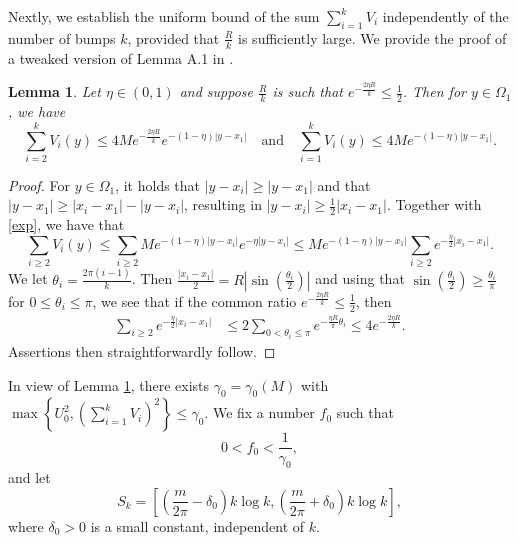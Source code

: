 \documentclass{amsart}
\newtheorem{lemma}[theorem]{Lemma}
\theoremstyle{definition}
\theoremstyle{remark}
\numberwithin{equation}{section}
\begin{document}
 
 



Nextly, we  establish the uniform bound of the sum $\displaystyle \sum_{i=1}^k V_{i}$ independently of the number of bumps $k$, provided that $\frac{R}{k}$ is sufficiently large. We provide the proof of a tweaked version of Lemma A.1 in \cite{wei_yan_2014}.
\begin{lemma}\label{ksum}  \cite[Lemma A.1]{wei_yan_2014} Let $\eta \in (0,1)$ and suppose $\frac{R}{k}$ is such that $e^{-\frac{2\eta R}{k}} \le \frac{1}{2}$. Then for $y \in{\Omega}_1$, we have 
$$\displaystyle \sum_{i=2}^k V_{i}(y) \le 4Me^{-\frac{2\eta R}{k}} e^{-(1-\eta)|y-x_1|} \quad\text{and} \quad \displaystyle \sum_{i=1}^k V_{i}(y) \le 4Me^{-(1-\eta)|y-x_1|}.$$
\end{lemma}
\begin{proof}

For $y\in \Omega_1$, it holds that $|y-x_i|\ge |y-x_1|$ and that $|y-x_1| \ge |x_i-x_1|-|y-x_i|$, resulting in $|y-x_i|\ge \frac{1}{2}|x_i-x_1|$. Together with \eqref{exp}, we have that
$$\sum_{i\ge 2} V_{i}(y) \le \sum_{i\ge 2} Me^{-(1-\eta)|y-x_i|} e^{-\eta|y-x_i|}
\le Me^{-(1-\eta)|y-x_1|}\sum_{i\ge 2} e^{-\frac{\eta}{2}|x_i-x_1|} .$$
We let $\theta_i = \frac{2\pi(i-1)}{k}$. Then $ \frac{|x_i-x_1|}{2} = R\left|\sin\left(\frac{\theta_i}{2}\right)\right|$ and using that $ \sin\left(\frac{\theta_i}{2}\right) \ge \frac{\theta_i}{\pi}$ for $0\le\theta_i \le \pi$, we see that  if the common ratio $e^{-\frac{2\eta R}{k}} \le \frac{1}{2}$, then
\begin{align}\label{sum2}
 \sum_{i\ge 2} e^{-\frac{\eta}{2}|x_i-x_1|} &\le 2\sum_{0<\theta_i \le \pi} e^{-\frac{\eta R}{\pi}\theta_i} \le 4 e^{-\frac{2\eta R}{k}}.
\end{align}
Assertions then straightforwardly follow.
 \end{proof}
In view of Lemma \ref{ksum}, there exists  $\gamma_0 = \gamma_0(M)$ with $\displaystyle \max\left\{U_0^2 , \left(\sum_{i=1}^k V_{i}\right)^2\right\} \le \gamma_0.$
We fix a number $f_0$ such that \begin{equation}\label{f0}0< f_0 < \frac{1}{\gamma_0},\end{equation}
and let \begin{equation}\label{sk}{S_k=\left[\left(\frac{m}{2\pi} -\delta_0\right)k\log k,\left(\frac{m}{2\pi}+\delta_0\right)k\log k\right],}\end{equation}
{where $\delta_0>0$ is a small constant, independent of $k$.}
\end{document}
